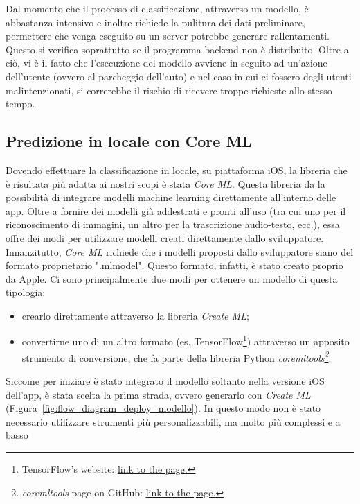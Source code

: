 Dal momento che il processo di classificazione, attraverso un modello, è 
abbastanza intensivo e inoltre richiede la pulitura dei dati preliminare,
permettere che venga eseguito su un server potrebbe generare rallentamenti.
Questo si verifica soprattutto se il programma backend non è distribuito.
Oltre a ciò, vi è il fatto che l'esecuzione del modello avviene in seguito
ad un'azione dell'utente (ovvero al parcheggio dell'auto) e nel caso in cui 
ci fossero degli utenti malintenzionati, si correrebbe il rischio di
ricevere troppe richieste allo stesso tempo.

\subsection{Predizione in locale con Core ML}

Dovendo effettuare la classificazione in locale, su piattaforma iOS, la 
libreria che è risultata più adatta ai nostri scopi è stata \emph{Core ML}.
Questa libreria da la possibilità di integrare modelli machine learning 
direttamente all'interno delle app. Oltre a fornire dei modelli già 
addestrati e pronti all'uso (tra cui uno per il riconoscimento di immagini,
un altro per la trascrizione audio-testo, ecc.), essa offre dei modi per 
utilizzare modelli creati direttamente dallo sviluppatore.\\
Innanzitutto, \emph{Core ML} richiede che i modelli proposti dallo
sviluppatore siano del formato proprietario ".mlmodel". Questo formato,
infatti, è stato creato proprio da Apple. Ci sono principalmente due 
modi per ottenere un modello di questa tipologia:
\begin{itemize}
    \item crearlo direttamente attraverso la libreria \emph{Create ML};
    \item convertirne uno di un altro formato (es. TensorFlow\footnote{
    TensorFlow's website: 
    \href{https://www.tensorflow.org}{\underline{link to the page.}}}) attraverso 
    un apposito strumento di conversione, che fa parte della libreria Python
    \emph{coremltools\footnote{
    \emph{coremltools} page on GitHub: 
    \href{https://apple.github.io/coremltools/}{\underline{link to the page.}}}};
\end{itemize}
Siccome per iniziare è stato integrato il modello soltanto nella versione
iOS dell'app, è stata scelta la prima strada, ovvero generarlo con
\emph{Create ML} (Figura~\ref{fig:flow_diagram_deploy_modello}). 
In questo modo non è stato necessario utilizzare
strumenti più personalizzabili, ma molto più complessi e a basso
